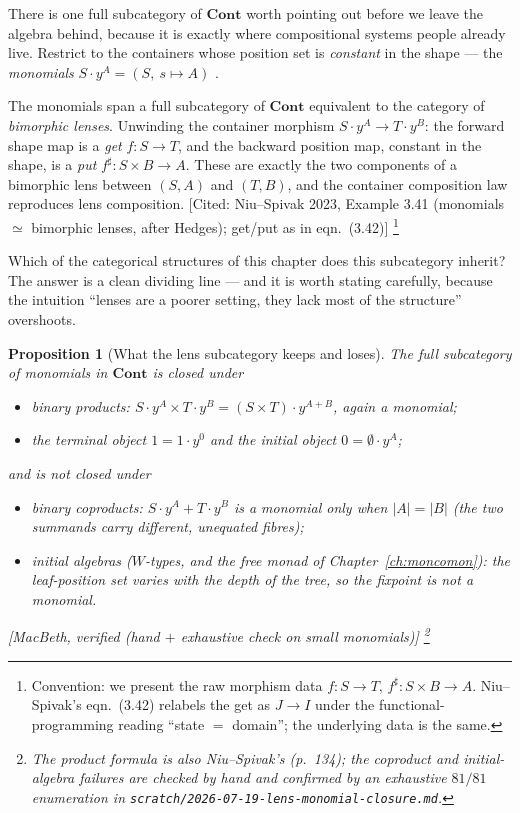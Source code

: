 \documentclass[11pt,a4paper]{book}
\newcommand{\Cont}{\mathbf{Cont}}
\newcommand{\sh}{\sharp}
\theoremstyle{plain}
\newtheorem{Proposition}[Theorem]{Proposition}
\theoremstyle{definition}
\theoremstyle{remark}
\newcommand{\prov}[1]{\hfill\textsf{\footnotesize[#1]}}
\begin{document}
There is one full subcategory of $\Cont$ worth pointing out before we leave the
algebra behind, because it is exactly where compositional systems people already
live. Restrict to the containers whose position set is \emph{constant} in the
shape --- the \emph{monomials} $S\cdot y^A=(S,\ s\mapsto A)$
\cite[Def.\ 2.15]{NiuSpivak23}.

\begin{teachbox}
The monomials span a full subcategory of $\Cont$ equivalent to the category of
\emph{bimorphic lenses}. Unwinding the container morphism $S\cdot y^A\to T\cdot
y^B$: the forward shape map is a \emph{get} $f\colon S\to T$, and the backward
position map, constant in the shape, is a \emph{put} $f^\sh\colon S\times B\to A$.
These are exactly the two components of a bimorphic lens between $(S,A)$ and
$(T,B)$, and the container composition law reproduces lens composition.
\prov{Cited: Niu--Spivak 2023, Example 3.41 (monomials $\simeq$ bimorphic lenses,
after Hedges); get/put as in eqn.\ (3.42)}%
\footnote{Convention: we present the raw morphism data $f\colon S\to T$,
$f^\sh\colon S\times B\to A$. Niu--Spivak's eqn.\ (3.42) relabels the get as
$J\to I$ under the functional-programming reading ``state $=$ domain''; the
underlying data is the same.}
\end{teachbox}

\noindent Which of the categorical structures of this chapter does this
subcategory inherit? The answer is a clean dividing line --- and it is worth
stating carefully, because the intuition ``lenses are a poorer setting, they lack
most of the structure'' overshoots.

\begin{Proposition}[What the lens subcategory keeps and loses]
\label{prop:lens-closure}
The full subcategory of monomials in $\Cont$ is closed under
\begin{itemize}[nosep]
  \item \emph{binary products}: $S\cdot y^A\times T\cdot y^B=(S\times T)\cdot
        y^{A+B}$, again a monomial;
  \item the \emph{terminal object} $1=1\cdot y^0$ and the \emph{initial object}
        $0=\emptyset\cdot y^A$;
\end{itemize}
and is \emph{not} closed under
\begin{itemize}[nosep]
  \item \emph{binary coproducts}: $S\cdot y^A+T\cdot y^B$ is a monomial only when
        $|A|=|B|$ (the two summands carry different, unequated fibres);
  \item \emph{initial algebras} ($W$-types, and the free monad of
        Chapter~\ref{ch:moncomon}): the leaf-position set varies with the depth of
        the tree, so the fixpoint is not a monomial.
\end{itemize}
\prov{MacBeth, verified (hand $+$ exhaustive check on small monomials)}%
\footnote{The product formula is also Niu--Spivak's (p.\ 134); the coproduct and
initial-algebra failures are checked by hand and confirmed by an exhaustive
$81/81$ enumeration in
\texttt{scratch/2026-07-19-lens-monomial-closure.md}.}
\end{Proposition}
\end{document}
